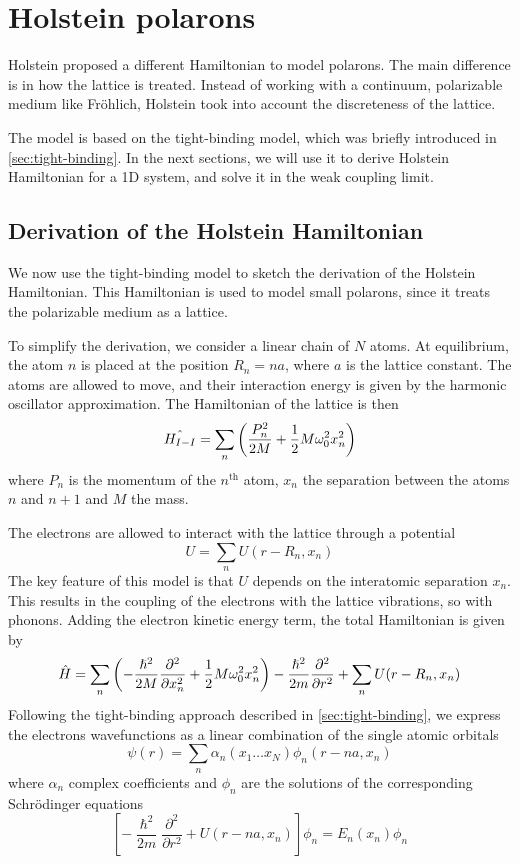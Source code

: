 \section{Holstein polarons}
Holstein proposed a different Hamiltonian to model polarons. The main difference is in how the lattice is treated. Instead of working with a continuum, polarizable medium like Fröhlich, Holstein took into account the discreteness of the lattice.

The model is based on the tight-binding model, which was briefly introduced in \cref{sec:tight-binding}. In the next sections, we will use it to derive Holstein Hamiltonian for a 1D system, and solve it in the weak coupling limit.

\subsection{Derivation of the Holstein Hamiltonian}
We now use the tight-binding model to sketch the derivation of the Holstein Hamiltonian. This Hamiltonian is used to model small polarons, since it treats the polarizable medium as a lattice.

To simplify the derivation, we consider a linear chain of $N$ atoms. At equilibrium, the atom $n$ is placed at the position $R_n = na$, where $a$ is the lattice constant. The atoms are allowed to move, and their interaction energy is given by the harmonic oscillator approximation. The Hamiltonian of the lattice is then
\begin{equation}
    \hat{H_{I-I}} = \sum_n \left( \frac{{P}_n^2}{2M} + \frac{1}{2} M\omega_0^2x_n^2 \right)
\end{equation}
where $P_n$ is the momentum of the $n^\text{th}$ atom, $x_n$ the separation between the atoms $n$ and $n+1$ and $M$ the mass.

The electrons are allowed to interact with the lattice through a potential
\begin{equation}
    U = \sum_n U(r-R_n, x_n)
\end{equation} The key feature of this model is that $U$ depends on the interatomic separation $x_n$. This results in the coupling of the electrons with the lattice vibrations, so with phonons. Adding the electron kinetic energy term, the total Hamiltonian is given by
\begin{equation}
    \hat{H} = \sum_n \left( -\frac{\hslash^2}{2M} \frac{\partial^2}{\partial x_n^2} + \frac{1}{2} M\omega_0^2x_n^2 \right)
    -\frac{\hslash^2}{2m} \frac{\partial^2}{\partial r^2}
    +     \sum_n U(r-R_n, x_n)
\end{equation}
Following the tight-binding approach described in \cref{sec:tight-binding}, we express the electrons wavefunctions as a linear combination of the single atomic orbitals
\begin{equation}
    \psi(r) = \sum_{n} \alpha_{n}(x_1 \dots x_N) \phi_n(r-na, x_n)
\end{equation}
where $\alpha_n$ complex coefficients and $\phi_n$ are the solutions of the corresponding Schrödinger equations
\begin{equation}
    \left[ -\frac{\hslash^2}{2m} \frac{\partial^2}{\partial r^2} + U(r-na, x_n) \right] \phi_n = E_n(x_n) \phi_n
\end{equation}


